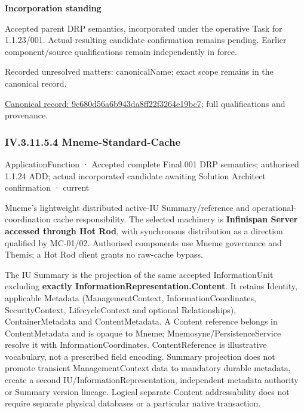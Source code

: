 \par\medskip\textbf{Incorporation standing}\par


Accepted parent DRP semantics, incorporated under the operative Task for 1.1.23/001. Actual resulting candidate confirmation remains pending. Earlier component/source qualifications remain independently in force.


{\small Recorded unresolved matters: canonicalName; exact scope remains in the canonical record.}\par
{\footnotesize \href{../../../../../../../continuum/application/application-function/9c680d56a6b943da8ff22f3264e19bc7.md}{Canonical record: 9c680d56a6b943da8ff22f3264e19bc7}; full qualifications and provenance.}\par
\subsubsection*{IV.3.11.5.4 Mneme-Standard-Cache}
\label{navigation:IV.3.11.5.4}

\label{element:cfe4e0dbe6894a14841452b731ab9cb8}
{\small ApplicationFunction · Accepted complete Final.001 DRP semantics; authorised 1.1.24 ADD; actual incorporated candidate awaiting Solution Architect confirmation · current}\par

Mneme's lightweight distributed active-IU Summary/reference and operational-coordination cache responsibility. The selected machinery is \textbf{Infinispan Server accessed through Hot Rod}, with synchronous distribution as a direction qualified by MC-01/02. Authorised components use Mneme governance and Themis; a Hot Rod client grants no raw-cache bypass.



The IU Summary is the projection of the same accepted InformationUnit excluding \textbf{exactly InformationRepresentation.Content}. It retains Identity, applicable Metadata (ManagementContext, InformationCoordinates, SecurityContext, LifecycleContext and optional Relationships), ContainerMetadata and ContentMetadata. A Content reference belongs in ContentMetadata and is opaque to Mneme; Mnemosyne/PersistenceService resolve it with InformationCoordinates. ContentReference is illustrative vocabulary, not a prescribed field encoding. Summary projection does not promote transient ManagementContext data to mandatory durable metadata, create a second IU/InformationRepresentation, independent metadata authority or Summary version lineage. Logical separate Content addressability does not require separate physical databases or a particular native transaction.



